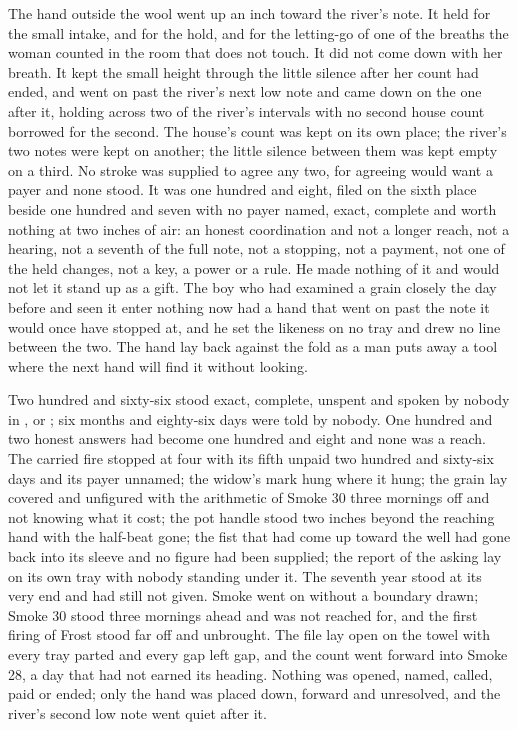 The hand outside the wool went up an inch toward the river's note. It held for the small intake, and for the hold, and for the letting-go of one of the breaths the woman counted in the room that does not touch. It did not come down with her breath. It kept the small height through the little silence after her count had ended, and went on past the river's next low note and came down on the one after it, holding across two of the river's intervals with no second house count borrowed for the second. The house's count was kept on its own place; the river's two notes were kept on another; the little silence between them was kept empty on a third. No stroke was supplied to agree any two, for agreeing would want a payer and none stood. It was one hundred and eight, filed on the sixth place beside one hundred and seven with no payer named, exact, complete and worth nothing at two inches of air: an honest coordination and not a longer reach, not a hearing, not a seventh of the full note, not a stopping, not a payment, not one of the held changes, not a key, a power or a rule. He made nothing of it and would not let it stand up as a gift. The boy who had examined a grain closely the day before and seen it enter nothing now had a hand that went on past the note it would once have stopped at, and he set the likeness on no tray and drew no line between the two. The hand lay back against the fold as a man puts away a tool where the next hand will find it without looking.

Two hundred and sixty-six stood exact, complete, unspent and spoken by nobody in ,  or ; six months and eighty-six days were told by nobody. One hundred and two honest answers had become one hundred and eight and none was a reach. The carried fire stopped at four with its fifth unpaid two hundred and sixty-six days and its payer unnamed; the widow's mark hung where it hung; the grain lay covered and unfigured with the arithmetic of Smoke 30 three mornings off and not knowing what it cost; the pot handle stood two inches beyond the reaching hand with the half-beat gone; the fist that had come up toward the well had gone back into its sleeve and no figure had been supplied; the report of the asking lay on its own tray with nobody standing under it. The seventh year stood at its very end and had still not given. Smoke went on without a boundary drawn; Smoke 30 stood three mornings ahead and was not reached for, and the first firing of Frost stood far off and unbrought. The file lay open on the towel with every tray parted and every gap left gap, and the count went forward into Smoke 28, a day that had not earned its heading. Nothing was opened, named, called, paid or ended; only the hand was placed down, forward and unresolved, and the river's second low note went quiet after it.
